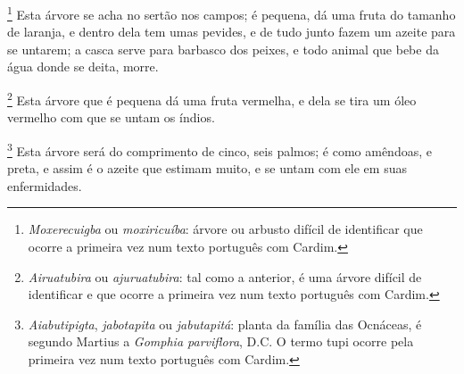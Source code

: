 \begin{linenumbers}
\footnote{ \textit{Moxerecuigba} ou
\textit{moxiricuíba}: árvore ou arbusto difícil de identificar que
ocorre a primeira vez num texto português com Cardim.} Esta árvore se
acha no sertão nos campos; é pequena, dá uma fruta do tamanho de
laranja, e dentro dela tem umas pevides, e de tudo junto fazem um
azeite para se untarem; a casca serve para barbasco dos peixes, e todo
animal que bebe da água donde se deita, morre. 

\footnote{ \textit{Airuatubira} ou
\textit{ajuruatubira}: tal como a anterior, é uma árvore difícil de
identificar e que ocorre a primeira vez num texto português com
Cardim.} Esta árvore que é pequena dá uma fruta vermelha, e
dela se tira um óleo vermelho com que se untam os índios. 

\enlargethispage{\baselineskip}

\footnote{ \textit{Aiabutipigta}, 
\textit{jabotapita} ou \textit{jabutapitá}: planta da família das
Ocnáceas, é segundo Martius a \textit{Gomphia parviflora}, D.C. O
termo tupi ocorre pela primeira vez num texto português com
Cardim.} Esta árvore será do comprimento de cinco, seis
palmos; é como amêndoas, e preta, e assim é o azeite que estimam muito,
e se untam com ele em suas enfermidades.


\end{linenumbers}
